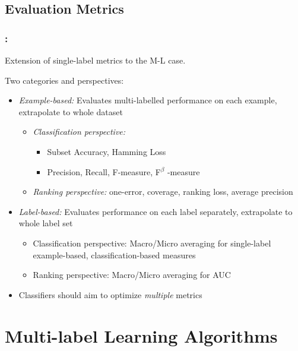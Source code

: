 \documentclass{beamer}
\begin{document}
\subsection{Evaluation Metrics}
\begin{frame}
\frametitle{\insertsection : \insertsubsection}
Extension of single-label metrics to the M-L case.

Two categories and perspectives:
\begin{itemize}
\item \emph{Example-based: }Evaluates multi-labelled performance on each example, extrapolate to whole dataset
\begin{itemize}
\item \emph{Classification perspective:}
\begin{itemize}
\item Subset Accuracy, Hamming Loss
\item Precision, Recall, F-measure, F$^\beta$ -measure
\end{itemize}
\item \emph{Ranking perspective:} one-error, coverage, ranking loss, average precision
\end{itemize}
\item \emph{Label-based: }Evaluates performance on each label separately, extrapolate to whole label set
\begin{itemize}
\item Classification perspective: Macro/Micro averaging for single-label example-based, classification-based measures
\item Ranking perspective: Macro/Micro averaging for AUC
\end{itemize}
\item[\rightarrow] Classifiers should aim to optimize \emph{multiple} metrics
\end{itemize}
\end{frame}
\section{Multi-label Learning Algorithms}
\end{document}
